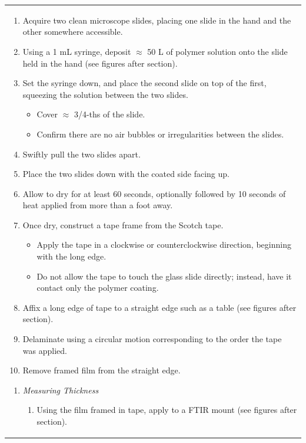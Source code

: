 \documentclass{article}
\begin{document}
\begin{center}
\begin{longtable}{ |p{\textwidth}| }
\begin{enumerate}[resume*=TE]
	\begin{enumerate}
		\item Acquire two clean microscope slides, placing one slide in the hand and the other somewhere accessible.
		\item Using a 1 mL syringe, deposit $\approx$ 50 \textmu L of polymer solution onto the slide held in the hand (see figures after section).
		\item Set the syringe down, and place the second slide on top of the first, squeezing the solution between the two slides.
		\begin{itemize}
			\item Cover $\approx$ 3/4-ths of the slide.
			\item Confirm there are no air bubbles or irregularities between the slides.
		\end{itemize}
		\item Swiftly pull the two slides apart.
		\item Place the two slides down with the coated side facing up.
		\item Allow to dry for at least 60 seconds, optionally followed by 10 seconds of heat applied from more than a foot away.
		\item Once dry, construct a tape frame from the Scotch tape.
		\begin{itemize}
			\item Apply the tape in a clockwise or counterclockwise direction, beginning with the long edge.
			\item Do not allow the tape to touch the glass slide directly; instead, have it contact only the polymer coating.
		\end{itemize}
		\item Affix a long edge of tape to a straight edge such as a table (see figures after section).
		\item Delaminate using a circular motion corresponding to the order the tape was applied.
		\item Remove framed film from the straight edge.
	\end{enumerate}
\end{enumerate}
\begin{enumerate}[resume*=TE]
	\item \textit{Measuring Thickness}
	\begin{enumerate}
		\item Using the film framed in tape, apply to a FTIR mount (see figures after section).
		\begin{itemize}

\end{itemize}
\end{enumerate}
\end{enumerate}
\end{longtable}
\end{center}
\end{document}
